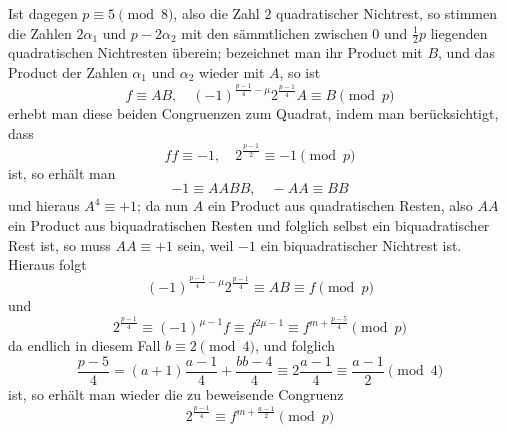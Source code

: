 Ist dagegen $p\equiv5\pmod8$, also die Zahl $2$ quadratischer Nichtrest, so stimmen die Zahlen $2\alpha_1$ und $p-2\alpha_2$ mit den sämmtlichen zwischen $0$ und $\frac12p$ liegenden quadratischen Nichtresten überein; bezeichnet man ihr Product mit $B$, und das Product der Zahlen $\alpha_1$ und $\alpha_2$ wieder mit $A$, so ist
\[
f\equiv AB,\quad(-1)^{\frac{p-1}4-\mu}2^{\frac{p-1}4}A\equiv B\pmod p
\]
erhebt man diese beiden Congruenzen zum Quadrat, indem man berücksichtigt, dass
\[
ff\equiv-1,\quad2^{\frac{p-1}2}\equiv-1\pmod p
\]
ist, so erhält man
\[
-1\equiv AABB,\quad-AA\equiv BB
\]
und hieraus $A^4\equiv+1$; da nun $A$ ein Product aus quadratischen Resten, also $AA$ ein Product aus biquadratischen Resten und folglich selbst ein biquadratischer Rest ist, so muss $AA\equiv+1$ sein, weil $-1$ ein biquadratischer Nichtrest ist. Hieraus folgt
\[
(-1)^{\frac{p-1}4-\mu}2^{\frac{p-1}4}\equiv AB\equiv f\pmod p
\]
und
\[
2^{\frac{p-1}4}\equiv(-1)^{\mu-1}f\equiv f^{2\mu-1}\equiv f^{m+\frac{p-5}4}\pmod p
\]
da endlich in diesem Fall $b\equiv2\pmod4$, und folglich
\[
\frac{p-5}4=(a+1)\frac{a-1}4+\frac{bb-4}4\equiv2\frac{a-1}4\equiv\frac{a-1}2\pmod4
\]
ist, so erhält man wieder die zu beweisende Congruenz
\[
2^{\frac{p-1}4}\equiv f^{m+\frac{a-1}2}\pmod p
\]
\BookRule{35mm}
